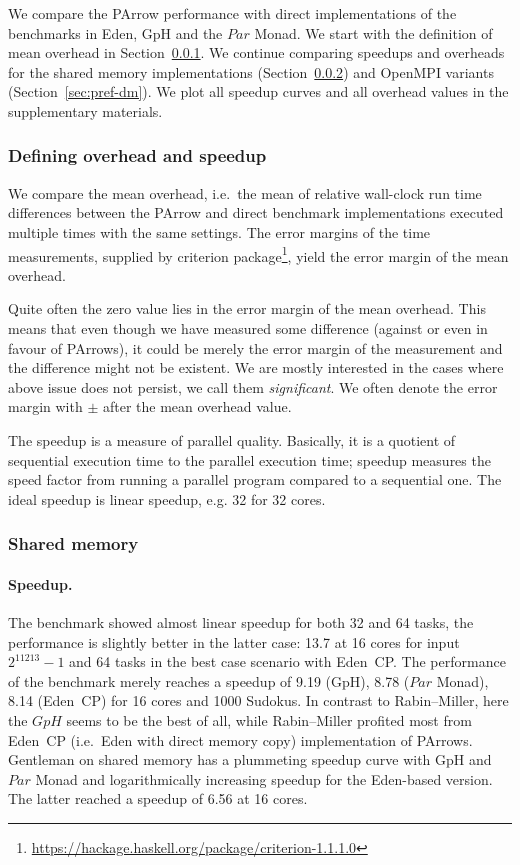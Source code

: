 \documentclass{jfp1}
\newcommand{\Conid}[1]{\mathit{#1}}
\DeclareRobustCommand{\hairspn}{\hspace{1pt}\nolinebreak}%
\DeclareRobustCommand{\ie}{{i.\hairspn{}e.~}}
\begin{document}
We compare the PArrow performance with direct implementations of the benchmarks in Eden, GpH and the \ensuremath{\Conid{Par}} Monad.
We start with the definition of mean overhead in Section~\ref{sec:def-overhead}. We continue comparing speedups and overheads for the shared memory implementations (Section~\ref{sec:pref-shm}) and  OpenMPI variants (Section~\ref{sec:pref-dm}). We plot all speedup curves and all overhead values in the supplementary materials.

\subsubsection{Defining overhead and speedup}
\label{sec:def-overhead}

We compare the mean overhead, \ie the mean of relative wall-clock run time differences between the PArrow and direct benchmark implementations executed multiple times with the same settings.
The error margins of the time measurements, supplied by criterion package\footnote{\url{https://hackage.haskell.org/package/criterion-1.1.1.0}}, yield the error margin of the mean overhead. 

Quite often the zero value lies in the error margin of the mean overhead. This means that even though we have measured some difference (against or even in favour of PArrows), it could be merely the error margin of the measurement and the difference might not be existent. We are mostly interested in the cases where above issue does not persist, we call them \emph{significant}. We often denote the error margin with $\pm$ after the mean overhead value.

The speedup is a measure of parallel quality. Basically, it is a quotient of sequential execution time to the parallel execution time; speedup measures the speed factor from running a parallel program compared to a sequential one. The ideal speedup is linear speedup, e.g. 32 for 32 cores.

\subsubsection{Shared memory}
\label{sec:pref-shm}

\paragraph{Speedup.}
The \rmtest benchmark showed almost linear speedup for both 32 and 64 tasks, the performance is slightly better in the latter case: 13.7 at 16 cores for input $2^{11213}-1$ and 64 tasks in the best case scenario with Eden~CP. The performance of the \sudokutest benchmark merely reaches a speedup of 9.19 (GpH), 8.78 (\ensuremath{\Conid{Par}} Monad), 8.14 (Eden~CP) for 16 cores and 1000 Sudokus. In contrast to Rabin--Miller, here the \ensuremath{\Conid{GpH}} seems to be the best of all, while Rabin--Miller profited most from Eden~CP (\ie Eden with direct memory copy) implementation of PArrows. Gentleman on shared memory has a plummeting speedup curve with GpH and \ensuremath{\Conid{Par}} Monad and logarithmically increasing speedup for the Eden-based version. The latter reached a speedup of 6.56 at 16 cores.
\end{document}
